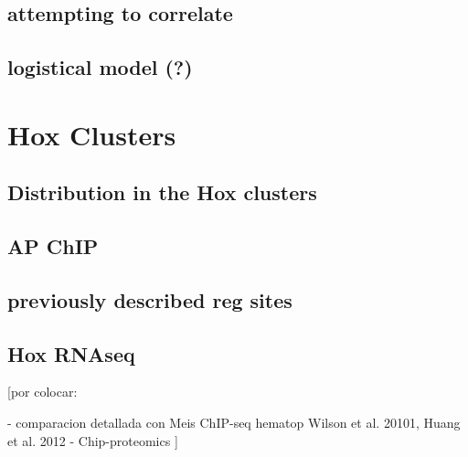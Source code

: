\subsection{attempting to correlate}

\subsection{logistical model (?)}

\section{Hox Clusters}

\subsection{Distribution in the Hox clusters}

\subsection{AP ChIP}

\subsection{previously described reg sites}

\subsection{Hox RNAseq}


[por colocar:

- comparacion detallada con Meis ChIP-seq hematop {Wilson et al. 20101, Huang et al. 2012}
- Chip-proteomics
]
